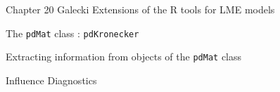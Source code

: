 Chapter 20 Galecki
Extensions of the R tools for LME models

The \texttt{pdMat} class :  \texttt{pdKronecker}

Extracting information from objects of the \texttt{pdMat} class 

Influence Diagnostics
